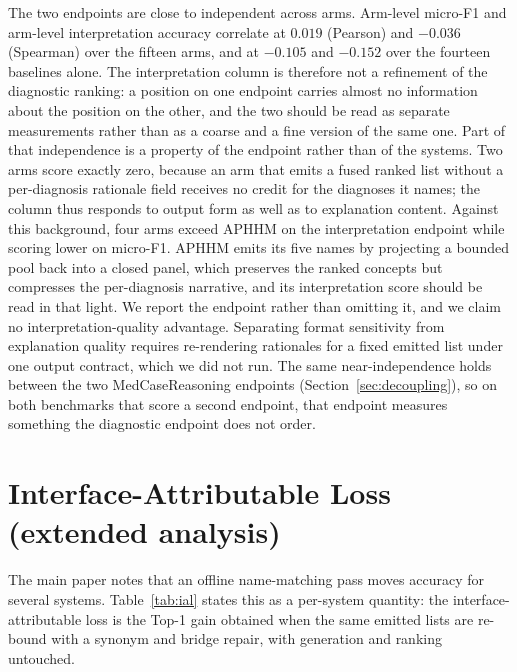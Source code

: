 \documentclass[letterpaper]{article}
\begin{document}
The two endpoints are close to independent across arms.
Arm-level micro-F1 and arm-level interpretation accuracy correlate at $0.019$ (Pearson) and $-0.036$ (Spearman) over the fifteen arms, and at $-0.105$ and $-0.152$ over the fourteen baselines alone.
The interpretation column is therefore not a refinement of the diagnostic ranking: a position on one endpoint carries almost no information about the position on the other, and the two should be read as separate measurements rather than as a coarse and a fine version of the same one.
Part of that independence is a property of the endpoint rather than of the systems.
Two arms score exactly zero, because an arm that emits a fused ranked list without a per-diagnosis rationale field receives no credit for the diagnoses it names; the column thus responds to output form as well as to explanation content.
Against this background, four arms exceed APHHM on the interpretation endpoint while scoring lower on micro-F1.
APHHM emits its five names by projecting a bounded pool back into a closed panel, which preserves the ranked concepts but compresses the per-diagnosis narrative, and its interpretation score should be read in that light.
We report the endpoint rather than omitting it, and we claim no interpretation-quality advantage.
Separating format sensitivity from explanation quality requires re-rendering rationales for a fixed emitted list under one output contract, which we did not run.
The same near-independence holds between the two MedCaseReasoning endpoints (Section~\ref{sec:decoupling}), so on both benchmarks that score a second endpoint, that endpoint measures something the diagnostic endpoint does not order.

\section{Interface-Attributable Loss (extended analysis)}
\label{sec:ial}

The main paper notes that an offline name-matching pass moves accuracy for several systems.
Table~\ref{tab:ial} states this as a per-system quantity: the interface-attributable loss is the Top-1 gain obtained when the same emitted lists are re-bound with a synonym and bridge repair, with generation and ranking untouched.
\end{document}
